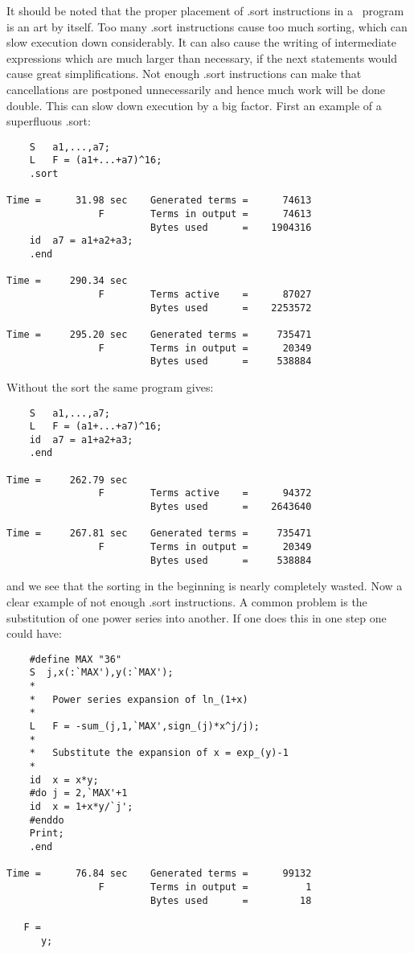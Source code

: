 It should be noted that the proper placement of .sort 
instructions in a \FORM\ program is an art by itself. Too many .sort 
instructions cause too much sorting, which can slow execution down 
considerably. It can also cause the writing of intermediate expressions 
which are much larger than necessary, if the next statements would cause 
great simplifications. Not enough .sort instructions can make that 
cancellations are postponed unnecessarily and hence much work will be done 
double. This can slow down execution by a big factor. First an example of a 
superfluous .sort:
\begin{verbatim}
    S	a1,...,a7;
    L	F = (a1+...+a7)^16;
    .sort

Time =      31.98 sec    Generated terms =      74613
                F        Terms in output =      74613
                         Bytes used      =    1904316
    id	a7 = a1+a2+a3;
    .end

Time =     290.34 sec
                F        Terms active    =      87027
                         Bytes used      =    2253572

Time =     295.20 sec    Generated terms =     735471
                F        Terms in output =      20349
                         Bytes used      =     538884
\end{verbatim}
Without the sort the same program gives:
\begin{verbatim}
    S	a1,...,a7;
    L	F = (a1+...+a7)^16;
    id	a7 = a1+a2+a3;
    .end

Time =     262.79 sec
                F        Terms active    =      94372
                         Bytes used      =    2643640

Time =     267.81 sec    Generated terms =     735471
                F        Terms in output =      20349
                         Bytes used      =     538884
\end{verbatim}
and we see that the sorting in the beginning is nearly completely wasted. 
Now a clear example of not enough .sort instructions. A common problem is 
the substitution of one power series into another. If 
one does this in one step one could have:
\begin{verbatim}
    #define MAX "36"
    S  j,x(:`MAX'),y(:`MAX');
    *
    *	Power series expansion of ln_(1+x)
    *
    L	F = -sum_(j,1,`MAX',sign_(j)*x^j/j);
    *
    *	Substitute the expansion of x = exp_(y)-1
    *
    id	x = x*y;
    #do j = 2,`MAX'+1
    id	x = 1+x*y/`j';
    #enddo
    Print;
    .end

Time =      76.84 sec    Generated terms =      99132
                F        Terms in output =          1
                         Bytes used      =         18

   F =
      y;
\end{verbatim}
